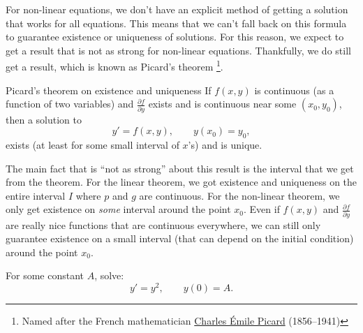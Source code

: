 For non-linear equations, we don't have an explicit method of getting a solution that works for all equations. This means that we can't fall back on this formula to guarantee existence or uniqueness of solutions. For this reason, we expect to get a result that is not as strong for non-linear equations. Thankfully, we do still get a result, which is known as Picard's theorem%
\footnote{Named after the French mathematician
\href{https://en.wikipedia.org/wiki/Charles_\%C3\%89mile_Picard}{Charles \'Emile Picard}
(1856--1941)}. 

\begin{theorem1}{Picard's theorem on existence and uniqueness}%
If $f(x,y)$ is continuous (as a function of two
variables) and $\frac{\partial f}{\partial y}$ exists and is
continuous near some $(x_0,y_0)$, then a solution to
\begin{equation*}
y' = f(x,y), \qquad y(x_0) = y_0,
\end{equation*}
exists (at least for some small interval of $x$'s) and is unique.
\end{theorem1}

The main fact that is ``not as strong'' about this result is the interval that we get from the theorem. For the linear theorem, we got existence and uniqueness on the entire interval $I$ where $p$ and $g$ are continuous. For the non-linear theorem, we only get existence on \emph{some} interval around the point $x_0$. Even if $f(x,y)$ and $\frac{\partial f}{\partial y}$ are really nice functions that are continuous everywhere, we can still only guarantee existence on a small interval (that can depend on the initial condition) around the point $x_0$. 

\begin{example}
For some constant $A$, solve:
\begin{equation*}
y' = y^2, \qquad y(0) = A .
\end{equation*}
\end{example}

